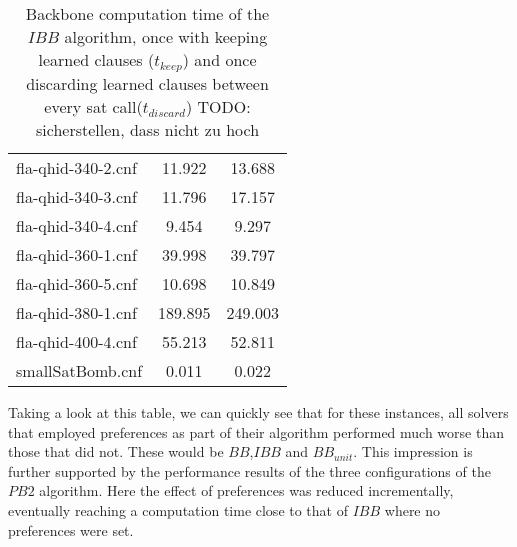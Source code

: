 \begin{wraptable}[29]{R}{7.5cm}
\begin{tabular}{l| c c }
fla-qhid-340-2.cnf & 11.922 & 13.688 \\
fla-qhid-340-3.cnf & 11.796 & 17.157 \\
fla-qhid-340-4.cnf & 9.454 & 9.297 \\
fla-qhid-360-1.cnf & 39.998 & 39.797 \\
fla-qhid-360-5.cnf & 10.698 & 10.849 \\
fla-qhid-380-1.cnf & 189.895 & 249.003 \\
fla-qhid-400-4.cnf & 55.213 & 52.811 \\
smallSatBomb.cnf & 0.011 & 0.022 \\
\end{tabular}
\caption[Benefit of keeping learned clauses in $IBB$]{Backbone computation time of the $IBB$ algorithm, once with keeping learned clauses ($t_{keep}$) and once discarding learned clauses between every sat call($t_{discard}$) TODO: sicherstellen, dass nicht zu hoch}
\label{tab:learnedIbb} %
\end{wraptable} 
Taking a look at this table, we can quickly see that for these instances, all solvers that employed preferences as part of their algorithm performed much worse than those that did not. These would be $BB$,$IBB$ and $BB_{unit}$. This impression is further supported by the performance results of the three configurations of the $PB2$ algorithm. Here the effect of preferences was reduced incrementally, eventually reaching a computation time close to that of $IBB$ where no preferences were set.




